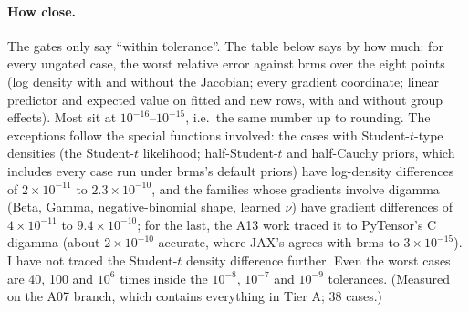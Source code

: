 \documentclass[11pt]{article}
\begin{document}
\paragraph{How close.} The gates only say ``within tolerance''. The table below says by how much: for every
ungated case, the worst relative error against brms over the eight points (log density with and without the Jacobian;
every gradient coordinate; linear predictor and expected value on fitted and new rows, with and without group effects).
Most sit at $10^{-16}$--$10^{-15}$, i.e.\ the same number up to rounding. The exceptions follow the special
functions involved: the cases with Student-$t$-type densities (the Student-$t$ likelihood; half-Student-$t$ and half-Cauchy priors,
which includes every case run under brms's default priors) have log-density differences of $2\times10^{-11}$ to
$2.3\times10^{-10}$, and the families whose
gradients involve digamma (Beta, Gamma, negative-binomial shape, learned $\nu$) have gradient differences of
$4\times10^{-11}$ to $9.4\times10^{-10}$; for the last, the A13 work traced it to PyTensor's C digamma (about
$2\times10^{-10}$ accurate, where JAX's agrees with brms to $3\times10^{-15}$). I have not traced the Student-$t$ density
difference further. Even the worst cases are 40, 100 and $10^{6}$ times inside the $10^{-8}$, $10^{-7}$ and $10^{-9}$
tolerances. (Measured on the A07 branch, which contains everything in Tier A; 38 cases.)
\end{document}
